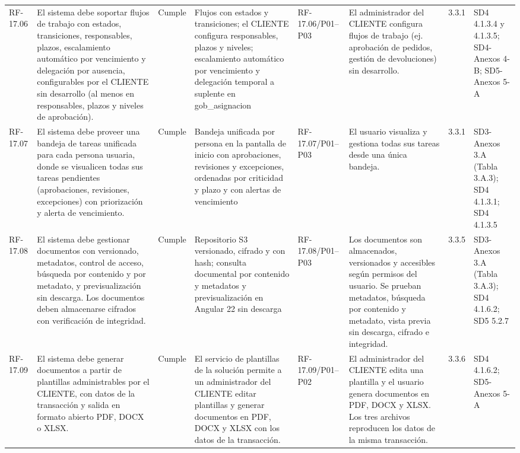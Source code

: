 \documentclass[oficio,firma,final]{lafrox}
\begin{document}
\begin{landscape}
{\begin{longtable}{@{}F{0.054} F{0.173} F{0.061} F{0.191} F{0.106} F{0.180} F{0.067} F{0.168}@{}}
  RF-17.06 & El sistema debe soportar flujos de trabajo con estados, transiciones, responsables, plazos, escalamiento automático por vencimiento y delegación por ausencia, configurables por el CLIENTE sin desarrollo (al menos en responsables, plazos y niveles de aprobación). & Cumple & Flujos con estados y transiciones; el CLIENTE configura responsables, plazos y niveles; escalamiento automático por vencimiento y delegación temporal a suplente en gob\_asignacion & RF-17.06/\allowbreak{}P01--\allowbreak{}P03 & El administrador del CLIENTE configura flujos de trabajo (ej. aprobación de pedidos, gestión de devoluciones) sin desarrollo. & 3.3.1 & SD4 4.1.3.4 y 4.1.3.5; SD4-Anexos 4-B; SD5-Anexos 5-A  \\
  RF-17.07 & El sistema debe proveer una bandeja de tareas unificada para cada persona usuaria, donde se visualicen todas sus tareas pendientes (aprobaciones, revisiones, excepciones) con priorización y alerta de vencimiento. & Cumple & Bandeja unificada por persona en la pantalla de inicio con aprobaciones, revisiones y excepciones, ordenadas por criticidad y plazo y con alertas de vencimiento & RF-17.07/\allowbreak{}P01--\allowbreak{}P03 & El usuario visualiza y gestiona todas sus tareas desde una única bandeja. & 3.3.1 & SD3-Anexos 3.A (Tabla 3.A.3); SD4 4.1.3.1; SD4 4.1.3.5  \\
  RF-17.08 & El sistema debe gestionar documentos con versionado, metadatos, control de acceso, búsqueda por contenido y por metadato, y previsualización sin descarga. Los documentos deben almacenarse cifrados con verificación de integridad. & Cumple & Repositorio S3 versionado, cifrado y con hash; consulta documental por contenido y metadatos y previsualización en Angular 22 sin descarga & RF-17.08/\allowbreak{}P01--\allowbreak{}P03 & Los documentos son almacenados, versionados y accesibles según permisos del usuario. Se prueban metadatos, búsqueda por contenido y metadato, vista previa sin descarga, cifrado e integridad. & 3.3.5 & SD3-Anexos 3.A (Tabla 3.A.3); SD4 4.1.6.2; SD5 5.2.7  \\
  RF-17.09 & El sistema debe generar documentos a partir de plantillas administrables por el CLIENTE, con datos de la transacción y salida en formato abierto PDF, DOCX o XLSX. & Cumple & El servicio de plantillas de la solución permite a un administrador del CLIENTE editar plantillas y generar documentos en PDF, DOCX y XLSX con los datos de la transacción. & RF-17.09/\allowbreak{}P01--\allowbreak{}P02 & El administrador del CLIENTE edita una plantilla y el usuario genera documentos en PDF, DOCX y XLSX. Los tres archivos reproducen los datos de la misma transacción. & 3.3.6 & SD4 4.1.6.2; SD5-Anexos 5-A  \\

\end{longtable}}
\end{landscape}
\end{document}
